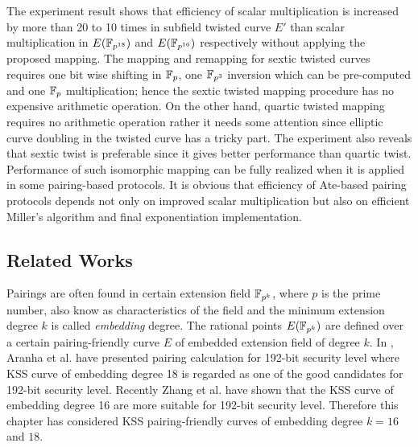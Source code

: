 The experiment result shows  that efficiency of  scalar multiplication is increased by more than 20 to 10 times in subfield  twisted curve $E'$ than scalar multiplication in $E(\mathbb{F}_{p^{18}})$ and $E(\mathbb{F}_{p^{16}})$ respectively without applying the proposed mapping. The mapping and remapping for sextic twisted curves requires one bit wise shifting in ${\mathbb{F}}_{p}$, one $\mathbb{F}_{p^3}$ inversion which can be pre-computed and one ${\mathbb{F}}_{p}$ multiplication; hence the sextic twisted mapping procedure has no expensive arithmetic operation. On the other hand, quartic twisted mapping requires no arithmetic operation rather it needs some attention since elliptic curve doubling in the twisted curve has a tricky part. The experiment also reveals that sextic twist is preferable since it gives better performance than quartic twist. 
Performance of such isomorphic mapping can be fully realized when it is applied in some pairing-based protocols. 
It is obvious that efficiency of Ate-based pairing protocols depends not only on improved scalar multiplication but also on efficient Miller's algorithm  and final exponentiation implementation. 

\subsection{Related Works}
Pairings are often found in certain extension field $\mathbb{F}_{p^k}$, where $p$ is the prime number, also know as characteristics of the field and the minimum extension degree $k$ is called \textit{embedding} degree. 
The rational points $E(\mathbb{F}_{p^k})$ are defined over a certain pairing-friendly curve $E$ of embedded extension field of degree $k$. 
In \cite{PAIRING:AFKMR12}, Aranha et al. have presented pairing calculation for 192-bit security level where  KSS curve of embedding degree 18 is regarded as one of the good candidates for 192-bit security level.
Recently Zhang et al. \cite{INDOCRYPT:ZhaLin12} have shown that the KSS curve of embedding degree 16 are more suitable for 192-bit security level.
Therefore this chapter has considered KSS pairing-friendly curves of embedding degree $k=16$ and $18$.

